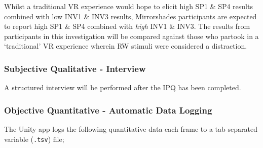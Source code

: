 
Whilst a traditional VR experience would hope to elicit high SP1 \& SP4 results combined with low INV1 \& INV3 results, Mirrorshades participants are expected to report high SP1 \& SP4 combined with \textit{high} INV1 \& INV3. The results from participants in this investigation will be compared against those who partook in a `traditional' VR experience wherein RW stimuli were considered a distraction.


\subsubsection{Subjective Qualitative - Interview}
A structured interview will be performed after the IPQ has been completed.

\subsubsection{Objective Quantitative - Automatic Data Logging}
The Unity app logs the following quantitative data each frame to a tab separated variable (\texttt{.tsv}) file;

